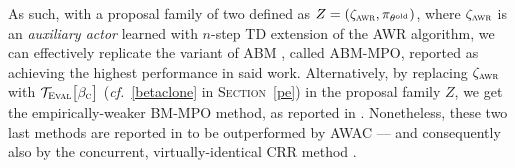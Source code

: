 As such, with a proposal family of two defined as $Z = (\zeta_\textsc{awr}, \pi_{\theta^\text{old}})$,
where $\zeta_\textsc{awr}$ is an \textit{auxiliary actor} learned with
$n$-step TD extension \cite{Peng1996-xn}
of the AWR \cite{Peng2019-hu} algorithm,
we can effectively replicate the variant of ABM \cite{Siegel2020-lo}, called ABM-MPO,
reported as achieving the highest performance in said work.
Alternatively, by replacing $\zeta_\textsc{awr}$ with $\mathcal{T}_\textsc{Eval}\big[\beta_\textsc{c}\big]$
(\textit{cf.}~\ref{betaclone} in \textsc{Section}~\ref{pe}) in the proposal family $Z$,
we get the empirically-weaker BM-MPO method, as reported in \cite{Siegel2020-lo}.
Nonetheless, these two last methods are reported in \cite{Nair2020-gd}
to be outperformed by AWAC \cite{Nair2020-gd}
--- and consequently also by the concurrent, virtually-identical CRR method \cite{Wang2020-sr}.

